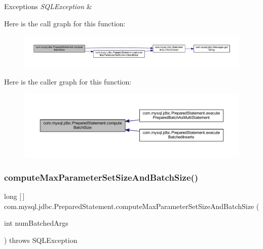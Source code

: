 \begin{DoxyExceptions}{Exceptions}
{\em S\+Q\+L\+Exception} & \\
\hline
\end{DoxyExceptions}
Here is the call graph for this function\+:
\nopagebreak
\begin{figure}[H]
\begin{center}
\leavevmode
\includegraphics[width=350pt]{classcom_1_1mysql_1_1jdbc_1_1_prepared_statement_a2de0ab2631bf812f061ea336302f2b62_cgraph}
\end{center}
\end{figure}
Here is the caller graph for this function\+:
\nopagebreak
\begin{figure}[H]
\begin{center}
\leavevmode
\includegraphics[width=350pt]{classcom_1_1mysql_1_1jdbc_1_1_prepared_statement_a2de0ab2631bf812f061ea336302f2b62_icgraph}
\end{center}
\end{figure}
\mbox{\label{classcom_1_1mysql_1_1jdbc_1_1_prepared_statement_a0bd3fe8e5e85dd522b3d84fb68b142ff}} 
\subsubsection{\texorpdfstring{compute\+Max\+Parameter\+Set\+Size\+And\+Batch\+Size()}{computeMaxParameterSetSizeAndBatchSize()}}
{\footnotesize\ttfamily long \mbox{[}$\,$\mbox{]} com.\+mysql.\+jdbc.\+Prepared\+Statement.\+compute\+Max\+Parameter\+Set\+Size\+And\+Batch\+Size (\begin{DoxyParamCaption}\item[{int}]{num\+Batched\+Args }\end{DoxyParamCaption}) throws S\+Q\+L\+Exception\hspace{0.3cm}{\ttfamily [protected]}}

